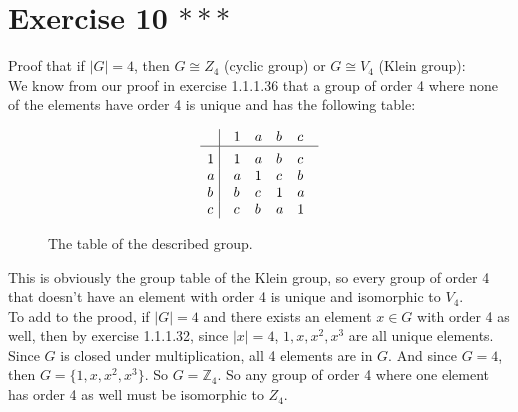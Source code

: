 \documentclass{article}
\newcommand{\Z}{\mathbb{Z}}
\begin{document}
    \section*{Exercise 10 $***$}
    Proof that if $|G| = 4$, 
    then $G \cong Z_4$ (cyclic group) or $G \cong V_4$ (Klein group): \\
    We know from our proof in exercise 1.1.1.36 that a group
    of order 4 where none of the elements have order 4
    is unique and has the following table:
    \begin{figure}[H]
        \centering

        \[\vbox{\tabskip0.5em\offinterlineskip
        \halign{\strut$#$\hfil\ \tabskip1em\vrule&&$#$\hfil\cr
        ~   & 1   & a   & b & c \cr
        \noalign{\hrule}\vrule height 12pt width 0pt
        1   & 1 & a & b & c \cr 
        a   & a & 1 & c & b \cr 
        b   & b & c & 1 & a \cr 
        c   & c & b & a & 1 \cr
        }}\]

        \caption{\label{fig:figure1} The table of the described group.}
    \end{figure}
    
    This is obviously the group table of the Klein group,
    so every group of order 4 that doesn't have
    an element with order 4 is unique and isomorphic to $V_4$. \\
    To add to the prood, if $|G| = 4$ and there exists
    an element $x \in G$ with order 4 as well,
    then by exercise 1.1.1.32, since $|x| = 4$,
    $1, x, x^2, x^3$ are all unique elements.
    Since $G$ is closed under multiplication,
    all 4 elements are in $G$.
    And since $G = 4$, then $G = \{1, x, x^2, x^3\}$.
    So $G = \Z_4$.
    So any group of order 4 where one element has order 4 as well
    must be isomorphic to $Z_4$.
\end{document}
